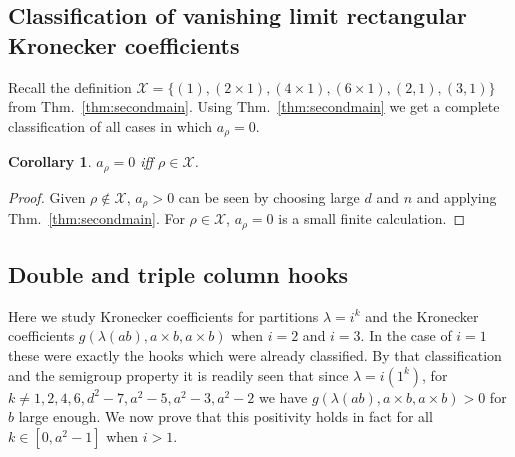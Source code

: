 \documentclass{article}
\numberwithin{equation}{section}
\newtheorem{corollary}[equation]{Corollary}
\theoremstyle{definition}
\newcommand{\exceptions}{{\mathscr{X}}}
\begin{document}
\subsection{Classification of vanishing limit rectangular Kronecker coefficients}
Recall the definition $\exceptions = \{(1),(2\times1),(4\times1),(6\times1),(2,1),(3,1)\}$ from Thm.~\ref{thm:secondmain}.
Using Thm.~\ref{thm:secondmain} we get a complete classification of all cases in which $a_\rho = 0$.
\begin{corollary}\label{cor:zeroness}
$a_\rho = 0$ iff $\rho \in \exceptions$.
\end{corollary}
\begin{proof}
Given $\rho \notin \exceptions$, $a_\rho>0$ can be seen by choosing large $d$ and $n$ and applying Thm.~\ref{thm:secondmain}.
For $\rho \in \exceptions$, $a_\rho=0$ is a small finite calculation.
\end{proof}

\subsection{Double and triple column hooks}

Here we study Kronecker coefficients for partitions $\lambda = i^k$ and the Kronecker coefficients $g(\lambda(ab), a \times b, a \times b)$ when  $i=2$ and $i=3$. In the case of $i=1$ these were exactly the hooks which were already classified. By that classification and the semigroup property it is readily seen that since $\lambda = i ( 1^k)$, for $k \neq 1,2,4,6, d^2-7, a^2-5, a^2-3, a^2-2$ we have $g(\lambda(ab), a \times b, a \times b)>0$ for $b$ large enough. We now prove that this positivity holds in fact for all $k \in [0,a^2-1]$ when $i>1$.
\end{document}
